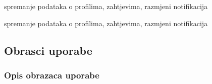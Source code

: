 \begin{packed_enum}
	\item  {}
	\begin{packed_enum}
		
		\item spremanje podataka o profilima, zahtjevima, razmjeni notifikacija
		
	\end{packed_enum}
	
	\item  {}
	\begin{packed_enum}
		
		\item spremanje podataka o profilima, zahtjevima, razmjeni notifikacija
		
	\end{packed_enum}
\end{packed_enum}

\eject 



\subsection{Obrasci uporabe}



\subsubsection{Opis obrazaca uporabe}

